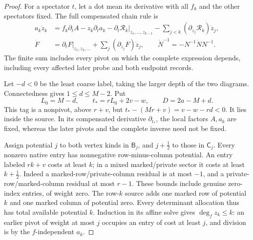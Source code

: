 \documentclass[11pt,a4paper]{amsart}
\numberwithin{equation}{section}
\theoremstyle{plain}
\theoremstyle{definition}
\begin{document}
\begin{proof}
For a spectator \(t\), let a dot mean its derivative with all \(f_k\)
and the other spectators fixed.  The full compensated chain rule is
\[
 \begin{aligned}
 a_k\dot z_k
 &=f_k\partial_tA-z_k\partial_ta_k
       -\left.\partial_t\mathscr R_k\right|_{z_1,\ldots,z_{k-1}}
       -\sum_{j<k}(\partial_{z_j}\mathscr R_k)\dot z_j,\\
 \dot F
 &=\left.\partial_tF\right|_{z_1,z_2,\ldots}
       +\sum_j(\partial_{z_j}F)\dot z_j,\qquad
 \dot N^{-1}=-N^{-1}\dot N N^{-1}.
 \end{aligned}
\]
The finite sum includes every pivot on which the complete expression
depends, including every affected later probe and both endpoint records.

Let \(-d<0\) be the least coarse label, taking the larger depth of
the two diagrams.  Connectedness gives \(1\le d\le M-2\).  Put
\[
 L_0=M-d,\qquad t_*=rL_0+2v-w,\qquad D=2a-M+d.
\]
This tag is a nonpivot, above \(r+v\), but
\(t_*-(Mr+v)=v-w-rd<0\).
It lies inside the source.  In its compensated derivative
\(\partial_{t_*}\), the local factors \(A,a_k\) are fixed, whereas
the later pivots and the complete inverse need not be fixed.

Assign potential \(j\) to both vertex kinds in \(\mathsf B_j\),
and \(j+\tfrac12\) to those in \(\mathsf C_j\).
Every nonzero native entry has nonnegative row-minus-column potential.
An entry labeled \(rk+v\) costs at least \(k\); in a mixed
marked/private sector it costs at least \(k+\tfrac12\).
Indeed a marked-row/private-column residual is at most \(-1\),
and a private-row/marked-column residual at most \(r-1\).
These bounds include genuine zero-index entries, of weight zero.
The row-\(k\) source adds one marked row of potential \(k\)
and one marked column of potential zero.  Every determinant
allocation thus has total available potential \(k\).
Induction in its affine solve gives \(\deg_f z_k\le k\):
an earlier pivot of weight at most \(j\) occupies an entry of cost
at least \(j\), and division is by the \(f\)-independent \(a_k\).


\end{proof}
\end{document}
